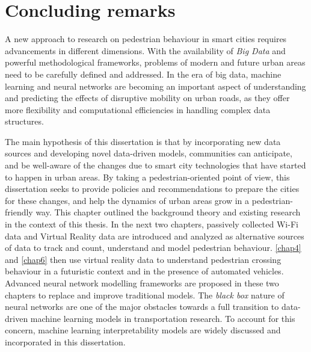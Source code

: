 \section{Concluding remarks}
A new approach to research on pedestrian behaviour in smart cities requires advancements in different dimensions. With the availability of \emph{Big Data} and powerful methodological frameworks, problems of modern and future urban areas need to be carefully defined and addressed. In the era of big data, machine learning and neural networks are becoming an important aspect of understanding and predicting the effects of disruptive mobility on urban roads, as they offer more flexibility and computational efficiencies in handling complex data structures.

The main hypothesis of this dissertation is that by incorporating new data sources and developing novel data-driven models, communities can anticipate, and be well-aware of the changes due to smart city technologies that have started to happen in urban areas. By taking a pedestrian-oriented point of view, this dissertation seeks to provide policies and recommendations to prepare the cities for these changes, and help the dynamics of urban areas grow in a pedestrian-friendly way. 
This chapter outlined the background theory and existing research in the context of this thesis.
In the next two chapters, passively collected Wi-Fi data and Virtual Reality data are introduced and analyzed as alternative sources of data to track and count, understand and model pedestrian behaviour. \cref{chap4} and \cref{chap6} then use virtual reality data to understand pedestrian crossing behaviour in a futuristic context and in the presence of automated vehicles. Advanced neural network modelling frameworks are proposed in these two chapters to replace and improve traditional models. The \textit{black box} nature of neural networks are one of the major obstacles towards a full transition to data-driven machine learning models in transportation research. To account for this concern, machine learning interpretability models are widely discussed and incorporated in this dissertation.

